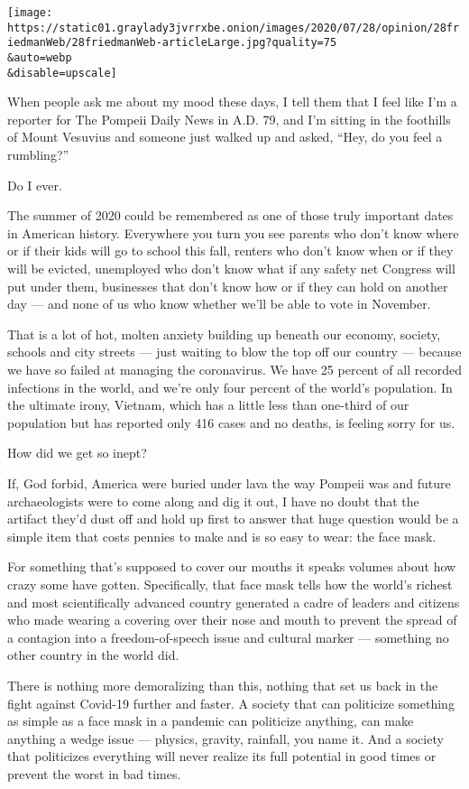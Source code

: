 \texttt{[image: https://static01.graylady3jvrrxbe.onion/images/2020/07/28/opinion/28friedmanWeb/28friedmanWeb-articleLarge.jpg?quality=75\\\&auto=webp\\\&disable=upscale]}

When people ask me about my mood these days, I tell them that I feel
like I'm a reporter for The Pompeii Daily News in A.D. 79, and I'm
sitting in the foothills of Mount Vesuvius and someone just walked up
and asked, ``Hey, do you feel a rumbling?''

Do I ever.

The summer of 2020 could be remembered as one of those truly important
dates in American history. Everywhere you turn you see parents who don't
know where or if their kids will go to school this fall, renters who
don't know when or if they will be evicted, unemployed who don't know
what if any safety net Congress will put under them, businesses that
don't know how or if they can hold on another day --- and none of us who
know whether we'll be able to vote in November.

That is a lot of hot, molten anxiety building up beneath our economy,
society, schools and city streets --- just waiting to blow the top off
our country --- because we have so failed at managing the coronavirus.
We have 25 percent of all recorded infections in the world, and we're
only four percent of the world's population. In the ultimate irony,
Vietnam, which has a little less than one-third of our population but
has reported only 416 cases and no deaths, is feeling sorry for us.

How did we get so inept?

If, God forbid, America were buried under lava the way Pompeii was and
future archaeologists were to come along and dig it out, I have no doubt
that the artifact they'd dust off and hold up first to answer that huge
question would be a simple item that costs pennies to make and is so
easy to wear: the face mask.

For something that's supposed to cover our mouths it speaks volumes
about how crazy some have gotten. Specifically, that face mask tells how
the world's richest and most scientifically advanced country generated a
cadre of leaders and citizens who made wearing a covering over their
nose and mouth to prevent the spread of a contagion into a
freedom-of-speech issue and cultural marker --- something no other
country in the world did.

There is nothing more demoralizing than this, nothing that set us back
in the fight against Covid-19 further and faster. A society that can
politicize something as simple as a face mask in a pandemic can
politicize anything, can make anything a wedge issue --- physics,
gravity, rainfall, you name it. And a society that politicizes
everything will never realize its full potential in good times or
prevent the worst in bad times.


